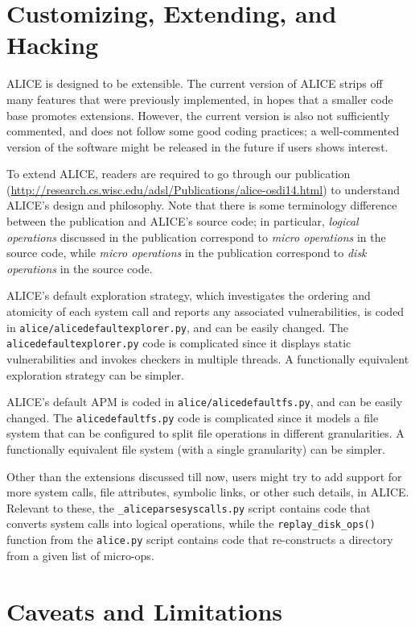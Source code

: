 \documentclass[oneside]{memoir}
\begin{document}
\chapter{Customizing, Extending, and Hacking}

ALICE is designed to be extensible. The current version of ALICE strips off many features that were previously implemented, in hopes that a smaller code base promotes extensions. However, the current version is also not sufficiently commented, and does not follow some good coding practices; a well-commented version of the software might be released in the future if users shows interest.

To extend ALICE, readers are required to go through our publication (\url{http://research.cs.wisc.edu/adsl/Publications/alice-osdi14.html}) to understand ALICE's design and philosophy. Note that there is some terminology difference between the publication and ALICE's source code; in particular, \textit{logical operations} discussed in the publication correspond to \textit{micro operations} in the source code, while \textit{micro operations} in the publication correspond to \textit{disk operations} in the source code.

ALICE's default exploration strategy, which investigates the ordering and atomicity of each system call and reports any associated vulnerabilities, is coded in \verb;alice/alicedefaultexplorer.py;, and can be easily changed. The \verb;alicedefaultexplorer.py; code is complicated since it displays static vulnerabilities and invokes checkers in multiple threads. A functionally equivalent exploration strategy can be simpler.

ALICE's default APM is coded in \verb;alice/alicedefaultfs.py;, and can be easily changed. The \verb;alicedefaultfs.py; code is complicated since it models a file system that can be configured to split file operations in different granularities. A functionally equivalent file system (with a single granularity) can be simpler.

Other than the extensions discussed till now, users might try to add support for more system calls, file attributes, symbolic links, or other such details, in ALICE. Relevant to these, the \verb;_aliceparsesyscalls.py; script contains code that converts system calls into logical operations, while the \verb;replay_disk_ops(); function from the \verb;alice.py; script contains code that re-constructs a directory from a given list of micro-ops.

\chapter{Caveats and Limitations}
\end{document}
